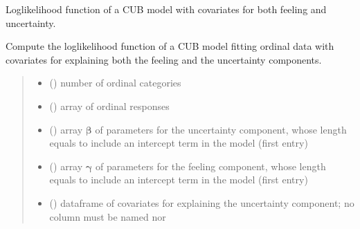 \documentclass[letterpaper,10pt,english]{sphinxmanual}
\begin{document}
\begin{fulllineitems}
\label{\detokenize{cubmods:cubmods.cub_yw.loglik}}
\pysigstartsignatures
{}
\pysigstopsignatures
\sphinxAtStartPar
Log\sphinxhyphen{}likelihood function of a CUB model with covariates for both feeling and uncertainty.

\sphinxAtStartPar
Compute the log\sphinxhyphen{}likelihood function of a CUB model fitting ordinal data
with covariates for explaining both the feeling and the uncertainty components.
\begin{quote}\begin{description}
\begin{itemize}
\item {} 
\sphinxAtStartPar
{} () \textendash{} number of ordinal categories

\item {} 
\sphinxAtStartPar
{} () \textendash{} array of ordinal responses

\item {} 
\sphinxAtStartPar
{} () \textendash{} array \(\pmb \beta\) of parameters for the uncertainty component, whose length equals 
 to include an intercept term in the model (first entry)

\item {} 
\sphinxAtStartPar
{} () \textendash{} array \(\pmb \gamma\) of parameters for the feeling component, whose length equals 
 to include an intercept term in the model (first entry)

\item {} 
\sphinxAtStartPar
{} () \textendash{} dataframe of covariates for explaining the uncertainty component;
no column must be named  nor 


\end{itemize}
\end{description}
\end{quote}
\end{fulllineitems}
\end{document}

